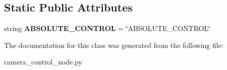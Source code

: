 \subsection*{Static Public Attributes}
\begin{DoxyCompactItemize}
\item 
\hypertarget{classcamera__control__node_1_1Joystick_aa2795dcb8fee14a8e96937dd5fb7edeb}{string {\bfseries A\-B\-S\-O\-L\-U\-T\-E\-\_\-\-C\-O\-N\-T\-R\-O\-L} = \char`\"{}A\-B\-S\-O\-L\-U\-T\-E\-\_\-\-C\-O\-N\-T\-R\-O\-L\char`\"{}}\label{classcamera__control__node_1_1Joystick_aa2795dcb8fee14a8e96937dd5fb7edeb}

\end{DoxyCompactItemize}


The documentation for this class was generated from the following file\-:\begin{DoxyCompactItemize}
\item 
camera\-\_\-control\-\_\-node.\-py\end{DoxyCompactItemize}
